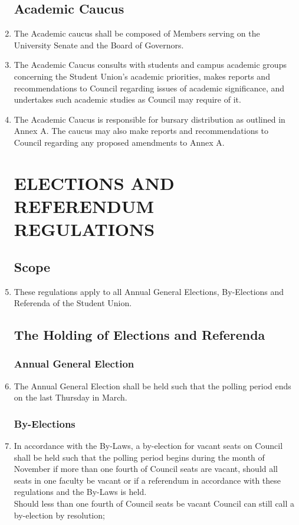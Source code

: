 \documentclass[oneside]{book}
\begin{document}
\begin{enumerate}

\chapter{\label{Academic_Caucus}Academic Caucus}
\item The Academic caucus shall be composed of Members serving on the University Senate and the Board of Governors.
\item The Academic Caucus consults with students and campus academic groups concerning the Student Union's academic priorities, makes reports and recommendations to Council regarding issues of academic significance, and undertakes such academic studies as Council may require of it.
\item The Academic Caucus is responsible for bursary distribution as outlined in Annex A. The caucus may also make reports and recommendations to Council regarding any proposed amendments to Annex A. 

\part{\label{ELECTIONS_AND_REFERENDUM_REGULATIONS}ELECTIONS AND REFERENDUM
REGULATIONS }
\chapter{\label{Elections_Scope}Scope }
\item These regulations apply to all Annual General Elections, By-Elections
and Referenda of the Student Union. 

\chapter{\label{The_Holding_of_Elections_and_Referenda}The Holding of Elections
and Referenda }


\section{\label{Annual_General_Election}Annual General Election }
\item The Annual General Election shall be held such that the polling period
ends on the last Thursday in March. 

\section{\label{By-Elections}By-Elections }
\item In accordance with the By-Laws, a by-election for vacant seats on
Council shall be held such that the polling period begins during the
month of November if more than one fourth of Council seats are vacant,
should all seats in one faculty be vacant or if a referendum in accordance
with these regulations and the By-Laws is held. \\
Should less than one fourth of Council seats be vacant Council can
still call a by-election by resolution; 


\end{enumerate}
\end{document}
